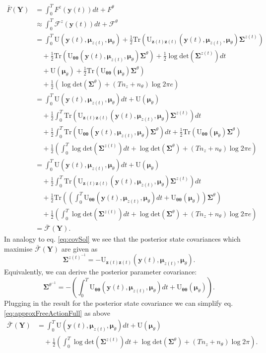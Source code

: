 \documentclass[a4paper,10pt]{article}
\newcommand{\bs}[1]{\mathbf{#1}}					%
\newcommand{\bgs}[1]{\boldsymbol{#1}}				%
\newcommand{\eq}[1]{\begin{equation} #1 \end{equation}}%
\newcommand{\trace}[1]{\mathrm{Tr}\left(#1\right)}					%
\renewcommand{\ss}{z}         %
\newcommand{\so}{y}         %
\renewcommand{\sp}{\theta}    %
\newcommand{\ps}{\bs{\ss}}    %
\newcommand{\po}{\bs{\so}}    %
\newcommand{\pp}{\bgs{\sp}} %
\newcommand{\Po}{\bs{Y}}    %
\newcommand{\U}{\mathrm{U}}			%
\newcommand{\F}{\mathcal{F}}				%
\newcommand{\Fa}{\bar{\mathcal{F}}}		%
\newcommand{\Cov}{\bgs{\Sigma}}			%
\renewcommand{\det}[1]{\mathrm{det}(#1)}	%
\begin{document}
\begin{align}
    \bar{F}(\Po) &= \int_0^T F^\ss(\po(t)) dt + F^\sp\\
    &\approx \int_0^T \F^\ss(\po(t)) dt + \F^\sp\\
    &= \int_0^T  \U(\po(t),\bgs{\mu}_{\ss(t)},\bgs{\mu}_\sp) + \frac{1}{2}\trace{\U_{\ps(t)\ps(t)}(\po(t),\bgs{\mu}_{\ss(t)},\bgs{\mu}_\sp)\Cov^{\ss(t)}}\nonumber\\
    &\quad + \frac{1}{2}\trace{\U_{\pp\pp}(\po(t),\bgs{\mu}_{\ss(t)},\bgs{\mu}_\sp)\Cov^\sp} + \frac{1}{2}\log \det{\Cov^{\ss(t)}} dt \nonumber\\ 
    &\quad + \U(\bgs{\mu}_\sp) + \frac{1}{2}\trace{\U_{\pp\pp}(\bgs{\mu}_\sp)\Cov^\sp}\nonumber\\
    &\quad + \frac{1}{2} \left(\log \det{\Cov^\sp} + (Tn_\ss + n_{\sp}) \log 2\pi e\right)\\
    &= \int_0^T  \U(\po(t),\bgs{\mu}_{\ss(t)},\bgs{\mu}_\sp)dt + \U(\bgs{\mu}_\sp) \nonumber\\
    &\quad + \frac{1}{2}\int_0^T \trace{\U_{\ps(t)\ps(t)}(\po(t),\bgs{\mu}_{\ss(t)},\bgs{\mu}_\sp)\Cov^{\ss(t)}}dt\nonumber\\
    &\quad + \frac{1}{2}\int_0^T \trace{\U_{\pp\pp}(\po(t),\bgs{\mu}_{\ss(t)},\bgs{\mu}_\sp)\Cov^\sp} dt + \frac{1}{2}\trace{\U_{\pp\pp}(\bgs{\mu}_\sp)\Cov^\sp}\nonumber\\
    &\quad + \frac{1}{2} \left(\int_0^T \log \det{\Cov^{\ss(t)}} dt + \log \det{\Cov^\sp} + (Tn_\ss + n_{\sp}) \log 2\pi e\right)\\
    &= \label{eq:approxFreeActionFull} \int_0^T  \U(\po(t),\bgs{\mu}_{\ss(t)},\bgs{\mu}_\sp)dt + \U(\bgs{\mu}_\sp) \nonumber\\
    &\quad + \frac{1}{2}\int_0^T \trace{\U_{\ps(t)\ps(t)}(\po(t),\bgs{\mu}_{\ss(t)},\bgs{\mu}_\sp)\Cov^{\ss(t)}}dt\nonumber\\
    &\quad + \frac{1}{2} \trace{\left(\int_0^T \U_{\pp\pp}(\po(t),\bgs{\mu}_{\ss(t)},\bgs{\mu}_\sp)dt + \U_{\pp\pp}(\bgs{\mu}_\sp)\right)\Cov^\sp}\nonumber\\
    &\quad + \frac{1}{2} \left(\int_0^T \log \det{\Cov^{\ss(t)}} dt + \log \det{\Cov^\sp} + (Tn_\ss + n_{\sp}) \log 2\pi e\right)\\
    &= \Fa(\Po).
\end{align}
In analogy to eq. \eqref{eq:covSol} we see that the posterior state covariances which maximise $\Fa(\Po)$ are given as
\eq{\label{eq:postCovStates}
    \Cov^{\ss(t)^{-1}} = -\U_{\ps(t)\ps(t)}(\po(t),\bgs{\mu}_{\ss(t)},\bgs{\mu}_\sp).
}
Equivalently, we can derive the posterior parameter covariance:
\eq{\label{eq:postCovParam}
    \Cov^{\sp^{-1}} = -\left(\int_0^T \U_{\pp\pp}(\po(t),\bgs{\mu}_{\ss(t)},\bgs{\mu}_\sp)dt + \U_{\pp\pp}(\bgs{\mu}_\sp)\right).
}
Plugging in the result for the posterior state covariance we can simplify eq. \eqref{eq:approxFreeActionFull} as above
\begin{align}
    \Fa(\Po) &= \label{eq:approxFreeAction} \int_0^T  \U(\po(t),\bgs{\mu}_{\ss(t)},\bgs{\mu}_\sp)dt +  \U(\bgs{\mu}_\sp) \nonumber\\
    &\quad + \frac{1}{2} \left(\int_0^T \log \det{\Cov^{\ss(t)}} dt + \log \det{\Cov^\sp} + (Tn_\ss + n_{\sp}) \log 2\pi\right).
\end{align}
\end{document}
